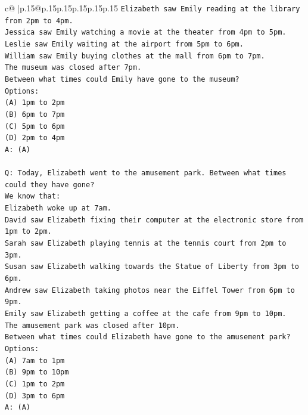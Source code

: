 \documentclass{article}
\begin{document}
{\begin{supertabular}{c@{$\;$}|p{.15\linewidth}@{}p{.15\linewidth}p{.15\linewidth}p{.15\linewidth}p{.15\linewidth}p{.15\linewidth}}
{{{\texttt{Elizabeth saw Emily reading at the library from 2pm to 4pm.} \\
\texttt{Jessica saw Emily watching a movie at the theater from 4pm to 5pm.} \\
\texttt{Leslie saw Emily waiting at the airport from 5pm to 6pm.} \\
\texttt{William saw Emily buying clothes at the mall from 6pm to 7pm.} \\
\texttt{The museum was closed after 7pm.} \\
\texttt{Between what times could Emily have gone to the museum?} \\
\texttt{Options:} \\
\texttt{(A) 1pm to 2pm} \\
\texttt{(B) 6pm to 7pm} \\
\texttt{(C) 5pm to 6pm} \\
\texttt{(D) 2pm to 4pm} \\
\texttt{A: (A)} \\
\\ 
\texttt{Q: Today, Elizabeth went to the amusement park. Between what times could they have gone?} \\
\texttt{We know that:} \\
\texttt{Elizabeth woke up at 7am.} \\
\texttt{David saw Elizabeth fixing their computer at the electronic store from 1pm to 2pm.} \\
\texttt{Sarah saw Elizabeth playing tennis at the tennis court from 2pm to 3pm.} \\
\texttt{Susan saw Elizabeth walking towards the Statue of Liberty from 3pm to 6pm.} \\
\texttt{Andrew saw Elizabeth taking photos near the Eiffel Tower from 6pm to 9pm.} \\
\texttt{Emily saw Elizabeth getting a coffee at the cafe from 9pm to 10pm.} \\
\texttt{The amusement park was closed after 10pm.} \\
\texttt{Between what times could Elizabeth have gone to the amusement park?} \\
\texttt{Options:} \\
\texttt{(A) 7am to 1pm} \\
\texttt{(B) 9pm to 10pm} \\
\texttt{(C) 1pm to 2pm} \\
\texttt{(D) 3pm to 6pm} \\
\texttt{A: (A)} \\
\\ 
}}}
\end{supertabular}}
\end{document}
